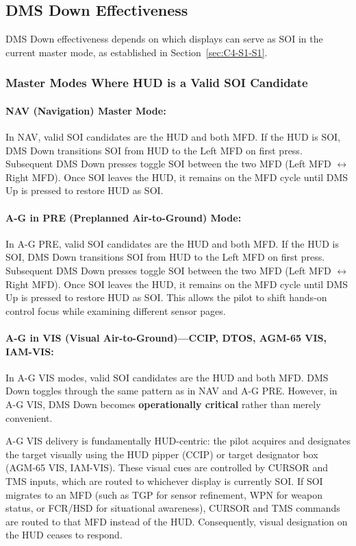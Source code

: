 \documentclass[11pt, a4paper, twoside]{report}
\begin{document}
\subsection{DMS Down Effectiveness}
\label{sec:C4-S3-S1}
DMS Down effectiveness depends on which displays can serve as SOI in the current master 
mode, as established in Section~\ref{sec:C4-S1-S1}.

\subsubsection{Master Modes Where HUD is a Valid SOI Candidate}
\label{sec:C4-S3-S1-S1}

\paragraph{NAV (Navigation) Master Mode:}
In NAV, valid SOI candidates are the HUD and both MFD. If the HUD is SOI, DMS Down transitions SOI from HUD to the Left MFD on first press. Subsequent DMS Down presses toggle SOI between the two MFD (Left MFD $\leftrightarrow$ Right MFD). Once SOI leaves the HUD, it remains on the MFD cycle until DMS Up is pressed to restore HUD as SOI.

\paragraph{A-G in PRE (Preplanned Air-to-Ground) Mode:}
In A-G PRE, valid SOI candidates are the HUD and both MFD. If the HUD is SOI, DMS Down transitions SOI from HUD to the Left MFD on first press. Subsequent DMS Down presses toggle SOI between the two MFD (Left MFD $\leftrightarrow$ Right MFD). Once SOI leaves the HUD, it remains on the MFD cycle until DMS Up is pressed to restore HUD as SOI. This allows the pilot to shift hands-on control focus while examining different sensor pages.

\paragraph{A-G in VIS (Visual Air-to-Ground)---CCIP, DTOS, AGM-65 VIS, IAM-VIS:}
In A-G VIS modes, valid SOI candidates are the HUD and both MFD. DMS Down toggles through the same pattern as in NAV and A-G PRE. However, in A-G VIS, DMS Down becomes \textbf{operationally critical} rather than merely convenient.

A-G VIS delivery is fundamentally HUD-centric: the pilot acquires and designates the target visually using the HUD pipper (CCIP) or target designator box (AGM-65 VIS, IAM-VIS). These visual cues are controlled by CURSOR and TMS inputs, which are routed to whichever display is currently SOI. If SOI migrates to an MFD (such as TGP for sensor refinement, WPN for weapon 
status, or FCR/HSD for situational awareness), CURSOR and TMS commands are routed to that MFD instead of the HUD. Consequently, visual designation on the HUD ceases to respond.
\end{document}
